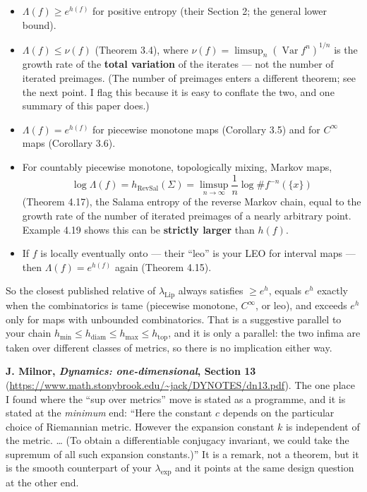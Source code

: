 \documentclass[
]{article}
\providecommand{\tightlist}{%
  \setlength{\itemsep}{0pt}\setlength{\parskip}{0pt}}
\begin{document}
\begin{itemize}
\tightlist
\item
  \(\Lambda(f)\ge e^{h(f)}\) for positive entropy (their Section 2; the general
  lower bound).
\item
  \(\Lambda(f)\le\nu(f)\) (Theorem 3.4), where
  \(\nu(f)=\limsup_n(\operatorname{Var}f^n)^{1/n}\) is the growth rate
  of the \textbf{total variation} of the iterates --- not the number of
  iterated preimages. (The number of preimages enters a different
  theorem; see the next point. I flag this because it is easy to
  conflate the two, and one summary of this paper does.)
\item
  \(\Lambda(f)=e^{h(f)}\) for piecewise monotone maps (Corollary 3.5)
  and for \(C^\infty\) maps (Corollary 3.6).
\item
  For countably piecewise monotone, topologically mixing, Markov maps,
  \[
  \log\Lambda(f)=h_{\mathrm{RevSal}}(\Sigma)=\limsup_{n\to\infty}\frac1n\log\#f^{-n}(\{x\})
  \] (Theorem 4.17), the Salama entropy of the reverse Markov chain,
  equal to the growth rate of the number of iterated preimages of a
  nearly arbitrary point. Example 4.19 shows this can be
  \textbf{strictly larger} than \(h(f)\).
\item
  If \(f\) is locally eventually onto --- their ``leo'' is your LEO for
  interval maps --- then \(\Lambda(f)=e^{h(f)}\) again (Theorem 4.15).
\end{itemize}

So the closest published relative of \(\lambda_{\mathrm{Lip}}\) always
satisfies \(\ge e^{h}\), equals \(e^{h}\) exactly when the combinatorics
is tame (piecewise monotone, \(C^\infty\), or leo), and exceeds
\(e^{h}\) only for maps with unbounded combinatorics. That is a
suggestive parallel to your chain
\(h_{\min}\le h_{\mathrm{diam}}\le h_{\max}\le h_{\mathrm{top}}\), and
it is only a parallel: the two infima are taken over different classes
of metrics, so there is no implication either way.

\textbf{J. Milnor, \emph{Dynamics: one-dimensional}, Section 13}
(\url{https://www.math.stonybrook.edu/~jack/DYNOTES/dn13.pdf}).
The one place I found where the ``sup over metrics'' move is stated as a
programme, and it is stated at the \emph{minimum} end: ``Here the
constant \(c\) depends on the particular choice of Riemannian metric.
However the expansion constant \(k\) is independent of the metric.
\ldots{} (To obtain a differentiable conjugacy invariant, we could take
the supremum of all such expansion constants.)'' It is a remark, not a
theorem, but it is the smooth counterpart of your \(\lambda_{\exp}\) and
it points at the same design question at the other end.
\end{document}
